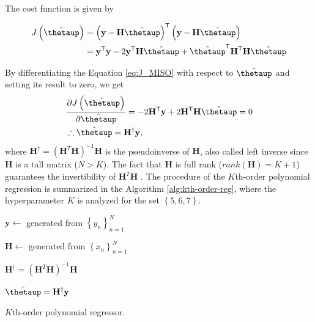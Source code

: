 \documentclass[english]{sobraep}
\newcommand{\trans}{\mathsf{T}}
\begin{document}
The cost function is given by

\begin{align}
    J\left( \hat{\boldsymbol{\thetaup}} \right) & = \left( \mathbf{y} - \mathbf{H} \hat{\boldsymbol{\thetaup}} \right)^{\trans} \left( \mathbf{y} - \mathbf{H} \hat{\boldsymbol{\thetaup}} \right) \nonumber \\
    & = \mathbf{y}^\trans\mathbf{y} - 2\mathbf{y}^\trans \mathbf{H}\hat{\boldsymbol{\thetaup}} + \hat{\boldsymbol{\thetaup}}^\trans \mathbf{H}^\trans \mathbf{H} \hat{\boldsymbol{\thetaup}}
    \label{eq:J_MISO}
\end{align}

By differentiating the Equation \eqref{eq:J_MISO} with respect to \(\hat{\boldsymbol{\thetaup}}\) and setting its result to zero, we get
\begin{align}
    &\frac{\partial J\left( \hat{\boldsymbol{\thetaup}} \right)}{\partial \hat{\boldsymbol{\thetaup}}} = - 2\mathbf{H}^\trans \mathbf{y} + 2 \mathbf{H}^\trans \mathbf{H} \hat{\boldsymbol{\thetaup}} = 0 \nonumber \\
    &\therefore \hat{\boldsymbol{\thetaup}} = \mathbf{H}^\dagger \mathbf{y},
\end{align}
where \(\mathbf{H}^\dagger = \left( \mathbf{H}^T\mathbf{H} \right)^{-1}\mathbf{H}\) is the pseudoinverse of \(\mathbf{H}\), also called left inverse since \(\mathbf{H}\) is a tall matrix (\(N>K\)). The fact that \(\mathbf{H}\) is full rank (\(rank(\mathbf{H})=K+1\)) guarantees the invertibility of \(\mathbf{H}^T\mathbf{H}\) \cite{strang1993introduction}. The procedure of the \(K\)th-order polynomial regression is summarized in the Algorithm \ref{alg:kth-order-reg}, where the hyperparameter \(K\) is analyzed for the set \(\left\{ 5,6,7 \right\}\).

\begin{algorithm}[!ht]
    \DontPrintSemicolon
      
        {
            \(\mathbf{y} \leftarrow\) generated from \(\left\{ y_n \right\}_{n=1}^N\)

            \(\mathbf{H} \leftarrow\) generated from \(\left\{ x_n \right\}_{n=1}^N\)

            \(\mathbf{H}^\dagger = \left( \mathbf{H}^T\mathbf{H} \right)^{-1}\mathbf{H}\) 

            \(\hat{\boldsymbol{\thetaup}} = \mathbf{H}^\dagger \mathbf{y}\)
        }
    
    \caption{\(K\)th-order polynomial regressor.}
    \label{alg:kth-order-reg}
\end{algorithm}
\end{document}
